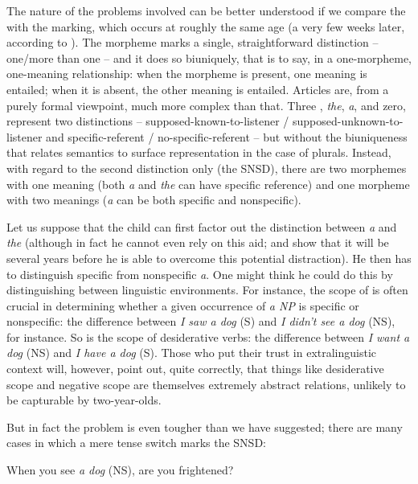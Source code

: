The nature of the problems involved can be better understood if we compare the    with the   marking, which occurs at roughly the same age (a very few weeks later, according to \citealt{Brown1973}). The  morpheme marks a single, straightforward distinction -- one/more than one -- and it does so biuniquely, that is to say, in a one-morpheme, one-meaning relationship: when the morpheme is present, one meaning is entailed; when it is absent, the other meaning is entailed. Articles are, from a purely formal viewpoint, much more complex than that. Three , \textit{the}, \textit{a}, and
zero, represent two distinctions -- supposed-known-to-listener / supposed-unknown-to-listener and specific-referent / no-specific-referent -- but without the biuniqueness that relates semantics to surface repre\-sentation in the case of plurals. Instead, with regard to the second distinction only (the SNSD), there are two morphemes with one meaning (both \textit{a} and \textit{the} can have specific reference) and one mor\-pheme with two meanings (\textit{a} can be both specific and nonspecific).

Let us suppose that the child can first factor out the distinction between \textit{a} and \textit{the} (although in fact he cannot even rely on this aid; \citet{Warden1976} and \citet{Karmiloff-Smith1979} show that it will be several years before he is able to overcome this potential distraction). He then has to distinguish specific from nonspecific \textit{a}. One might think he could do this by distinguishing between linguistic environ\-ments. For instance, the scope of  is often crucial in determin\-ing whether a given occurrence of \textit{a NP} is specific or nonspecific: the difference between \textit{I saw a dog} (S) and \textit{I didn't see a dog} (NS), for instance. So is the scope of desiderative verbs: the difference between \textit{I want a dog} (NS) and \textit{I have a dog} (S). Those who put their trust in extralinguistic context will, however, point out, quite correctly, that things like desiderative scope and negative scope are themselves ex\-tremely abstract relations, unlikely to be capturable by two-year-olds.

But in fact the problem is even tougher than we have suggested; there are many cases in which a mere tense switch marks the SNSD:

\ea\label{ex:3:11}
 When you see \textit{a dog} (NS), are you frightened? 
\z

